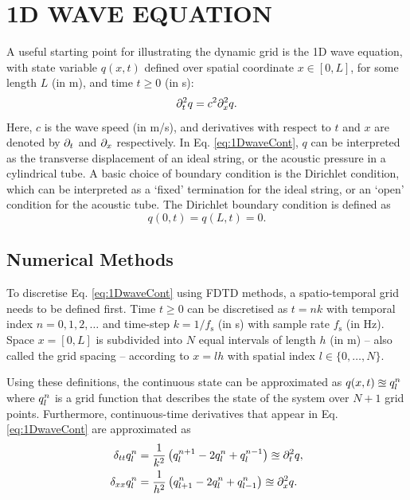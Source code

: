 \documentclass[fleqn]{jaes}
\begin{document}
\section{1D WAVE EQUATION}\label{sec:continuous}
A useful starting point for illustrating the dynamic grid is the 1D wave equation, with state variable $q(x, t)$ defined over spatial coordinate $x \in [0, L]$, for some length $L$ (in m), and time $t \geq 0$ (in s):
\begin{equation}\label{eq:1DwaveCont}
    \ptt q = c^2 \pxx q.
\end{equation}
Here, $c$ is the wave speed (in m/s), and derivatives with respect to $t$ and $x$ are denoted by $\partial_t$ and $\partial_x$ respectively. In Eq. \eqref{eq:1DwaveCont}, $q$ can be interpreted as the transverse displacement of an ideal string, or the acoustic pressure in a cylindrical tube. A basic choice of boundary condition is the Dirichlet condition, which can be interpreted as a `fixed' termination for the ideal string, or an `open' condition for the acoustic tube. The Dirichlet boundary condition is defined as
\begin{equation}%
    q(0, t) = q(L, t) = 0.\label{eq:contDirichlet}
\end{equation}
\subsection{Numerical Methods}\label{sec:numericalMethods}
To discretise Eq. \eqref{eq:1DwaveCont} using FDTD methods, a spatio-temporal grid needs to be defined first. 
Time $t\geq 0$ can be discretised as $t = nk$ with temporal index $n = 0, 1, 2, \hdots$ and time-step $k = 1/f_\text{s}$ (in s) with sample rate $f_\text{s}$ (in Hz). Space $x = [0, L]$ is subdivided into $N$ equal intervals of length $h$ (in m) -- also called the grid spacing -- according to $x = lh$ with spatial index $l\in \{0, \hdots, N\}$. 

Using these definitions, the continuous state can be approximated as $q(x,t) \approxeq q_l^n$ where $q_l^n$ is a grid function that describes the state of the system over $N+1$ grid points. Furthermore, continuous-time derivatives that appear in Eq. \eqref{eq:1DwaveCont} are approximated as
\begin{subequations}{\label{eq:FDoperators}}
\begin{align}
    \dtt \qln &= \frac{1}{k^2}\left(q_l^{n+1} - 2 \qln + q_l^{n-1}\right)\approxeq\ptt q  ,\\
    \dxx \qln &= \frac{1}{h^2}\left(q_{l+1}^n - 2 \qln + q_{l-1}^n\right)\approxeq \pxx q .
\end{align}
\end{subequations}
\end{document}
